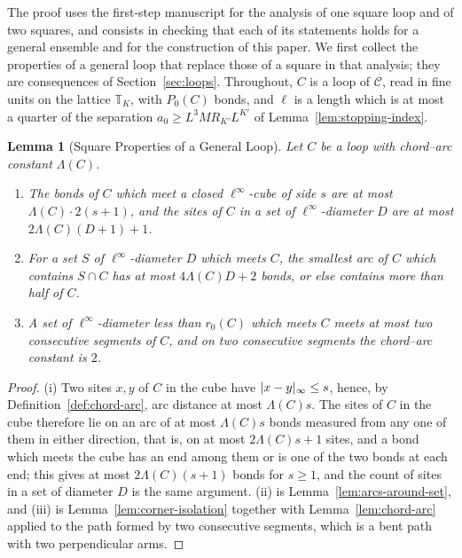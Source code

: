 \documentclass[11pt]{preprint}
\DeclarePairedDelimiter{\abs}{\lvert}{\rvert}
\numberwithin{equation}{section}
\newtheorem{lemma}[theorem]{Lemma}
\theoremstyle{definition}
\theoremstyle{remark}
\theoremstyle{plain}
\begin{document}
The proof uses the first-step manuscript \cite{WilsonFirstStep} for the analysis of one square loop and of two squares, and consists in checking that each of its statements holds for a general ensemble and for the construction of this paper. We first collect the properties of a general loop that replace those of a square in that analysis; they are consequences of Section~\ref{sec:loops}. Throughout, $C$ is a loop of $\mathcal C$, read in fine units on the lattice $\mathbb T_K$, with $P_0(C)$ bonds, and $\ell$ is a length which is at most a quarter of the separation $a_0 \geq L^3MR_{K'}L^{K'}$ of Lemma~\ref{lem:stopping-index}.

\begin{lemma}[Square Properties of a General Loop]\label{lem:square-properties}
Let $C$ be a loop with chord--arc constant $\Lambda(C)$.
\begin{enumerate}[label=(\roman*)]
\item The bonds of $C$ which meet a closed $\ell^\infty$-cube of side $s$ are at most $\Lambda(C)\cdot 2(s + 1)$, and the sites of $C$ in a set of $\ell^\infty$-diameter $D$ are at most $2\Lambda(C)(D + 1) + 1$.
\item For a set $S$ of $\ell^\infty$-diameter $D$ which meets $C$, the smallest arc of $C$ which contains $S \cap C$ has at most $4\Lambda(C)D + 2$ bonds, or else contains more than half of $C$.
\item A set of $\ell^\infty$-diameter less than $r_0(C)$ which meets $C$ meets at most two consecutive segments of $C$, and on two consecutive segments the chord--arc constant is $2$.
\end{enumerate}
\end{lemma}

\begin{proof}
(i) Two sites $x, y$ of $C$ in the cube have $\abs{x - y}_\infty \leq s$, hence, by Definition~\ref{def:chord-arc}, arc distance at most $\Lambda(C)s$. The sites of $C$ in the cube therefore lie on an arc of at most $\Lambda(C)s$ bonds measured from any one of them in either direction, that is, on at most $2\Lambda(C)s + 1$ sites, and a bond which meets the cube has an end among them or is one of the two bonds at each end; this gives at most $2\Lambda(C)(s + 1)$ bonds for $s \geq 1$, and the count of sites in a set of diameter $D$ is the same argument. (ii) is Lemma~\ref{lem:arcs-around-set}, and (iii) is Lemma~\ref{lem:corner-isolation} together with Lemma~\ref{lem:chord-arc} applied to the path formed by two consecutive segments, which is a bent path with two perpendicular arms.
\end{proof}
\end{document}
